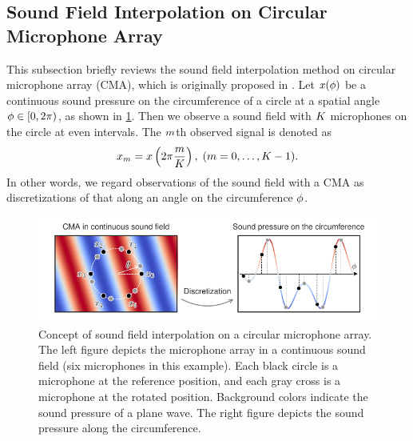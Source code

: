\documentclass[sip,biber]{now-journal}
\begin{document}
\subsection{Sound Field Interpolation on Circular Microphone Array}
This subsection briefly reviews the sound field interpolation method on circular microphone array (CMA), which is originally proposed in \cite{Wakabayashi:2021:ICASSP,Wakabayashi:2023:ASLP}.
Let $x (\phi)$ be a continuous sound pressure on the circumference of a circle at a spatial angle $\rotCoor \in \interval[open right,soft open fences]{0}{2\pi}$, as shown in \cref{fig:sfi}.
Then we observe a sound field with $K$ microphones on the circle at even intervals.
The $m$th observed signal is denoted as
\begin{equation}
  \sfcma _{\mic} = \sfcma \left(2\pi \frac{\mic}{\Mic}\right),\; (\mic = 0, \dots, \Mic - 1).%
  \label{eq:sfi:model}
\end{equation}
In other words, we regard observations of the sound field with a CMA as discretizations of that along an angle on the circumference $\phi$.
\begin{figure}[t]
  \centering
  \includegraphics{figures/diagrams/sfi.pdf}
  \caption{%
    Concept of sound field interpolation on a circular microphone array.
    The left figure depicts the microphone array in a continuous sound field (six microphones in this example).
    Each black circle is a microphone at the reference position, and each gray cross is a microphone at the rotated position.
    Background colors indicate the sound pressure of a plane wave.
    The right figure depicts the sound pressure along the circumference.
  }%
  \label{fig:sfi}
\end{figure}
\end{document}
